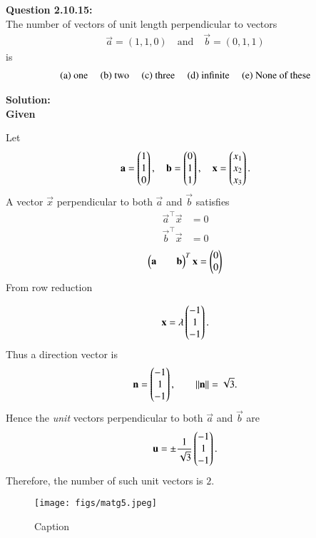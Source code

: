 \documentclass[journal]{IEEEtran}
\begin{document}



\textbf{Question 2.10.15:} \\
The number of vectors of unit length perpendicular to vectors 
\begin{align}
\vec{a} = (1,1,0) \quad \text{and} \quad \vec{b} = (0,1,1)
\end{align}
is
\begin{align}
\text{(a) one \quad (b) two \quad (c) three \quad (d) infinite \quad (e) None of these}
\end{align}

\textbf{Solution:}\\
 \textbf{Given}  
\begin{solution}
Let
\begin{align}
\mathbf{a}=\begin{pmatrix}1\\1\\0\end{pmatrix},\quad 
\mathbf{b}=\begin{pmatrix}0\\1\\1\end{pmatrix}, \quad
\mathbf{x}=\begin{pmatrix}x_1\\x_2\\x_3\end{pmatrix}.
\end{align}
A vector $\vec{x}$ perpendicular to both $\vec{a}$ and $\vec{b}$ satisfies
\begin{align}
\vec{a}^\top\vec{x} &= 0 
\label{eq:q1-ax0}\\
\vec{b}^\top\vec{x} &= 0 
\label{eq:q1-bx0}
\end{align}
\begin{align}
    \begin{myvec}{\vec{a} &&\vec{b}}^T\end{myvec}\vec{x}=\begin{myvec}{0\\0}
    \end{myvec}
\end{align}
From row reduction

\begin{align}
\mathbf{x}=\lambda\begin{pmatrix}-1\\1\\-1\end{pmatrix}.
\label{eq:q1-dir}
\end{align}
Thus a direction vector is
\begin{align}
\mathbf{n}=\begin{pmatrix}-1\\1\\-1\end{pmatrix},\qquad 
\|\mathbf{n}\|=\sqrt{3}.
\label{eq:q1-norm}
\end{align}
Hence the \emph{unit} vectors perpendicular to both $\vec{a}$ and $\vec{b}$ are
\begin{align}
\mathbf{u}=\pm\frac{1}{\sqrt{3}}\begin{pmatrix}-1\\1\\-1\end{pmatrix}.
\label{eq:q1-unit}
\end{align}
Therefore, the number of such unit vectors is $\boxed{2}$.
\end{solution}
 
\newpage
\begin{figure}
    \centering
    \texttt{[image: figs/matg5.jpeg]}
    \caption{Caption}
    \label{fig:placeholder}
\end{figure}
\end{document}
